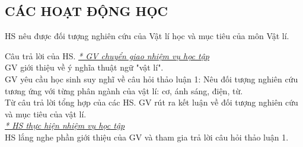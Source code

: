 \subsection{CÁC HOẠT ĐỘNG HỌC}
{HS nêu được đối tượng nghiên cứu của Vật lí học và mục tiêu của môn Vật lí.

}
{
Câu trả lời của HS.
}
{
\textit{\underline{* GV chuyển giao nhiệm vụ học tập}}\\
GV giới thiệu về ý nghĩa thuật ngữ "vật lí". \\
GV yêu cầu học sinh suy nghĩ về câu hỏi thảo luận 1: Nêu đối tượng nghiên cứu tương ứng với từng phân ngành của vật lí: cơ, ánh sáng, điện, từ.\\
Từ câu trả lời tổng hợp của các HS. GV rút ra kết luận về đối tượng nghiên cứu và mục tiêu của vật lí.\\
\textit{\underline{* HS thực hiện nhiệm vụ học tập}}\\
HS lắng nghe phần giới thiệu của GV và tham gia trả lời câu hỏi thảo luận 1.
}

